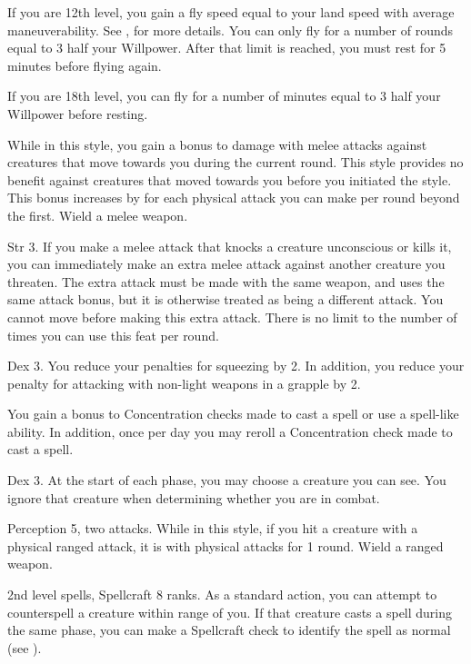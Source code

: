 If you are 12th level, you gain a fly speed equal to your land speed with average maneuverability.
See , for more details.
You can only fly for a number of rounds equal to 3 \add half your Willpower.
After that limit is reached, you must rest for 5 minutes before flying again.

If you are 18th level, you can fly for a number of minutes equal to 3 \add half your Willpower before resting.

\featben While in this style, you gain a  bonus to damage with melee attacks against creatures that move towards you during the current round.
This style provides no benefit against creatures that moved towards you before you initiated the style.
This bonus increases by  for each physical attack you can make per round beyond the first.
\stylereq Wield a melee weapon.

\featpres
Str 3.
\featben If you make a melee attack that knocks a creature unconscious or kills it, you can immediately make an extra melee attack against another creature you threaten.
The extra attack must be made with the same weapon, and uses the same attack bonus, but it is otherwise treated as being a different attack.
You cannot move before making this extra attack.
There is no limit to the number of times you can use this feat per round.

\featpre Dex 3.
\featben You reduce your penalties for squeezing by 2. In addition, you reduce your penalty for attacking with non-light weapons in a grapple by 2.

\featben You gain a  bonus to Concentration checks made to cast a spell or use a spell-like ability.
In addition, once per day you may reroll a Concentration check made to cast a spell.

\featpre Dex 3.
\featben At the start of each phase, you may choose a creature you can see.
You ignore that creature when determining whether you are \engaged in combat.

\featpres Perception 5, two attacks.
\featben While in this style, if you hit a creature with a physical ranged attack, it is \impaired with physical attacks for 1 round.
\stylereq Wield a ranged weapon.

\featpres 2nd level spells, Spellcraft 8 ranks.
\featben As a standard action, you can attempt to counterspell a creature within \rngmed range of you.
If that creature casts a spell during the same phase, you can make a Spellcraft check to identify the spell as normal (see ).

